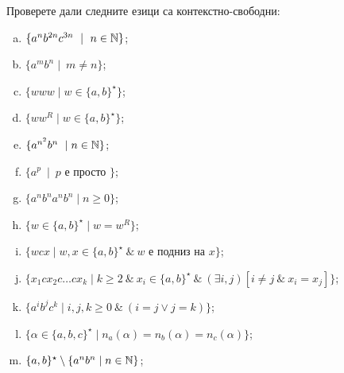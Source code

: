 \begin{problem}
  Проверете дали следните езици са контекстно-свободни:
  \begin{enumerate}[a)]
  \item
    $\{a^nb^{2n}c^{3n}\ \mid\ n\in\N\}$;
  \item
    $\{a^mb^n\mid\ m \neq n\}$;
  \item
    $\{www\mid w\in \{a,b\}^\star\}$;
  \item
    $\{ww^R\mid w\in \{a,b\}^\star\}$;
  \item
    $\{a^{n^2}b^n\ \mid n \in \mathbb{N}\}$;
  \item
    $\{a^p\ \mid\ p\mbox{ е просто }\}$;
  \item
    $\{a^nb^na^nb^n\mid n\geq 0\}$;
  \item
    $\{w \in \{a,b\}^\star \mid w = w^R\}$;
  \item
    $\{w c x\mid w,x\in \{a,b\}^\star\ \&\ w\mbox{ е подниз на }x\}$;
  \item
    $\{x_1 c x_2 c \dots c x_k\mid k\geq 2\ \&\ x_i\in\{a,b\}^\star\ \&\ (\exists i,j)[i \neq j\ \&\ x_i = x_j]\}$;
  \item
    $\{a^ib^jc^k\mid i,j,k\geq 0\ \&\ (i = j \vee j = k)\}$;
  \item
    $\{\alpha \in \{a,b,c\}^\star\mid n_a(\alpha) = n_b(\alpha) = n_c(\alpha)\}$;
  \item
    $\{a,b\}^\star \setminus \{a^nb^n\mid n\in \mathbb{N}\}$;
  \end{enumerate}
\end{problem}
